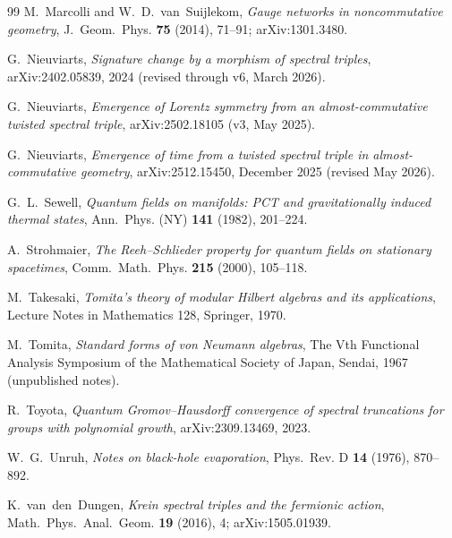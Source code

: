 \documentclass[11pt,a4paper]{article}
\theoremstyle{plain}
\theoremstyle{definition}
\begin{document}
\begin{thebibliography}{99}
M.~Marcolli and W.~D.~van~Suijlekom,
\newblock \emph{Gauge networks in noncommutative geometry},
\newblock J.~Geom.~Phys. \textbf{75} (2014), 71--91;
\newblock arXiv:1301.3480.

G.~Nieuviarts,
\newblock \emph{Signature change by a morphism of spectral
triples},
\newblock arXiv:2402.05839, 2024 (revised through v6, March 2026).

G.~Nieuviarts,
\newblock \emph{Emergence of Lorentz symmetry from an
almost-commutative twisted spectral triple},
\newblock arXiv:2502.18105 (v3, May 2025).

G.~Nieuviarts,
\newblock \emph{Emergence of time from a twisted spectral triple
in almost-commutative geometry},
\newblock arXiv:2512.15450, December 2025 (revised May 2026).

G.~L.~Sewell,
\newblock \emph{Quantum fields on manifolds: PCT and gravitationally
induced thermal states},
\newblock Ann.~Phys. (NY) \textbf{141} (1982), 201--224.

A.~Strohmaier,
\newblock \emph{The Reeh--Schlieder property for quantum fields on
stationary spacetimes},
\newblock Comm.~Math.~Phys. \textbf{215} (2000), 105--118.

M.~Takesaki,
\newblock \emph{Tomita's theory of modular Hilbert algebras and its
applications},
\newblock Lecture Notes in Mathematics 128, Springer, 1970.

M.~Tomita,
\newblock \emph{Standard forms of von Neumann algebras},
\newblock The Vth Functional Analysis Symposium of the Mathematical
Society of Japan, Sendai, 1967 (unpublished notes).

R.~Toyota,
\newblock \emph{Quantum Gromov--Hausdorff convergence of spectral
truncations for groups with polynomial growth},
\newblock arXiv:2309.13469, 2023.

W.~G.~Unruh,
\newblock \emph{Notes on black-hole evaporation},
\newblock Phys.~Rev. D \textbf{14} (1976), 870--892.

K.~van~den~Dungen,
\newblock \emph{Krein spectral triples and the fermionic action},
\newblock Math.~Phys.~Anal.~Geom. \textbf{19} (2016), 4;
\newblock arXiv:1505.01939.


\end{thebibliography}
\end{document}

